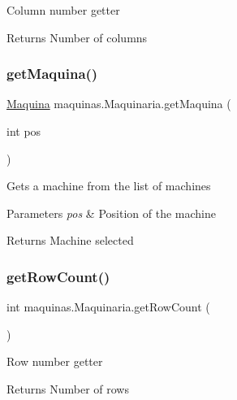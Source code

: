 Column number getter \begin{DoxyReturn}{Returns}
Number of columns 
\end{DoxyReturn}
\mbox{\label{classmaquinas_1_1_maquinaria_a438161cbcee58e47e57c1c1f0d0207eb}} 
\subsubsection{\texorpdfstring{get\+Maquina()}{getMaquina()}}
{\footnotesize\ttfamily \mbox{\hyperlink{classmaquinas_1_1_maquina}{Maquina}} maquinas.\+Maquinaria.\+get\+Maquina (\begin{DoxyParamCaption}\item[{int}]{pos }\end{DoxyParamCaption})\hspace{0.3cm}{\ttfamily [inline]}}

Gets a machine from the list of machines 
\begin{DoxyParams}{Parameters}
{\em pos} & Position of the machine \\
\hline
\end{DoxyParams}
\begin{DoxyReturn}{Returns}
Machine selected 
\end{DoxyReturn}
\mbox{\label{classmaquinas_1_1_maquinaria_aeceaddd786b36d5be354b8e9a581caa3}} 
\subsubsection{\texorpdfstring{get\+Row\+Count()}{getRowCount()}}
{\footnotesize\ttfamily int maquinas.\+Maquinaria.\+get\+Row\+Count (\begin{DoxyParamCaption}{ }\end{DoxyParamCaption})\hspace{0.3cm}{\ttfamily [inline]}}

Row number getter \begin{DoxyReturn}{Returns}
Number of rows 
\end{DoxyReturn}
\mbox{\label{classmaquinas_1_1_maquinaria_a0fa4ffa21f2f3cc2386634fb4c8b810e}} 
